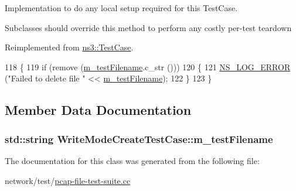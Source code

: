 Implementation to do any local setup required for this Test\+Case. 

Subclasses should override this method to perform any costly per-\/test teardown 

Reimplemented from \hyperlink{classns3_1_1TestCase_a8917f1604e28d312a8086f76291e3c46}{ns3\+::\+Test\+Case}.


\begin{DoxyCode}
118 \{
119   \textcolor{keywordflow}{if} (\textcolor{keyword}{remove} (\hyperlink{classWriteModeCreateTestCase_a2dcb2ef5d9a2f9597f0cf646dcd600b8}{m\_testFilename}.c\_str ()))
120     \{
121       \hyperlink{group__logging_ga0261a8db1d4ac5f79417d117634fd455}{NS\_LOG\_ERROR} (\textcolor{stringliteral}{"Failed to delete file "} << \hyperlink{classWriteModeCreateTestCase_a2dcb2ef5d9a2f9597f0cf646dcd600b8}{m\_testFilename});
122     \}
123 \}
\end{DoxyCode}


\subsection{Member Data Documentation}
\subsubsection[{\texorpdfstring{m\+\_\+test\+Filename}{m_testFilename}}]{\setlength{\rightskip}{0pt plus 5cm}std\+::string Write\+Mode\+Create\+Test\+Case\+::m\+\_\+test\+Filename\hspace{0.3cm}{\ttfamily [private]}}\hypertarget{classWriteModeCreateTestCase_a2dcb2ef5d9a2f9597f0cf646dcd600b8}{}\label{classWriteModeCreateTestCase_a2dcb2ef5d9a2f9597f0cf646dcd600b8}


The documentation for this class was generated from the following file\+:\begin{DoxyCompactItemize}
\item 
network/test/\hyperlink{pcap-file-test-suite_8cc}{pcap-\/file-\/test-\/suite.\+cc}\end{DoxyCompactItemize}
